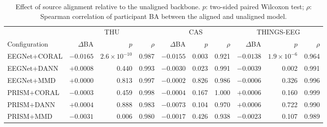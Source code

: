 \begin{table}[H]
\centering
\caption{Effect of source alignment relative to the unaligned backbone. $p$: two-sided paired Wilcoxon test; $\rho$: Spearman correlation of participant BA between the aligned and unaligned model.}
\label{tab:supp-alignment}
\scriptsize
\begin{adjustbox}{max width=\textwidth}
\begin{tabular}{@{}lrrrrrrrrr@{}}
\toprule
& \multicolumn{3}{c}{THU} & \multicolumn{3}{c}{CAS} & \multicolumn{3}{c}{THINGS-EEG} \\
\cmidrule(lr){2-4}\cmidrule(lr){5-7}\cmidrule(lr){8-10}
Configuration & $\Delta$BA & $p$ & $\rho$ & $\Delta$BA & $p$ & $\rho$ & $\Delta$BA & $p$ & $\rho$ \\
\midrule
EEGNet$+$CORAL & $-0.0165$ & $2.6\times10^{-10}$ & 0.987 & $-0.0155$ & 0.003 & 0.921 & $-0.0138$ & $1.9\times10^{-6}$ & 0.964 \\
EEGNet$+$DANN & $+0.0008$ & 0.440 & 0.993 & $-0.0030$ & 0.023 & 0.991 & $-0.0039$ & 0.002 & 0.991 \\
EEGNet$+$MMD & $+0.0000$ & 0.813 & 0.997 & $-0.0002$ & 0.826 & 0.986 & $-0.0006$ & 0.326 & 0.996 \\
PRISM$+$CORAL & $-0.0003$ & 0.459 & 0.998 & $-0.0004$ & 0.167 & 1.000 & $+0.0006$ & 0.160 & 0.999 \\
PRISM$+$DANN & $+0.0004$ & 0.888 & 0.983 & $-0.0073$ & 0.104 & 0.970 & $+0.0006$ & 0.722 & 0.990 \\
PRISM$+$MMD & $-0.0031$ & 0.006 & 0.980 & $-0.0017$ & 0.426 & 0.938 & $-0.0023$ & 0.107 & 0.989 \\
\bottomrule
\end{tabular}
\end{adjustbox}
\end{table}
